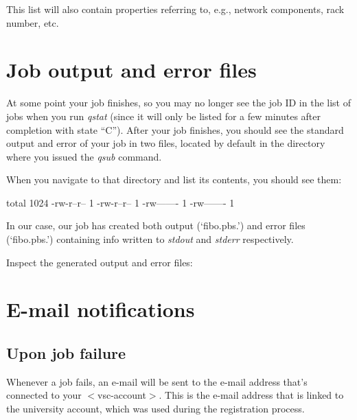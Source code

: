 This list will also contain properties referring to, e.g., network components,
rack number, etc.

\section{Job output and error files}

At some point your job finishes, so you may no longer see the job ID in the
list of jobs when you run \emph{qstat} (since it will only be listed for a few
minutes after completion with state ``C''). After your job finishes, you should
see the standard output and error of your job in two files, located by default
in the directory where you issued the \emph{qsub} command.


When you navigate to that directory and list its contents, you should see them:

\begin{prompt}
total 1024
-rw-r--r-- 1 %
-rw-r--r-- 1 %
-rw------- 1 %
-rw------- 1 %
\end{prompt}

In our case, our job has created both output (`fibo.pbs.\jobnumber') and
error files (`fibo.pbs.\jobnumber') containing info written to
\emph{stdout} and \emph{stderr} respectively.

Inspect the generated output and error files:

\begin{prompt}
\end{prompt}

\section{E-mail notifications}

\ifgent
\else
  \subsection{Upon job failure}
  
  Whenever a job fails, an e-mail will be sent to the e-mail address that's
  connected to your $<$vsc-account$>$. This is the e-mail address that is linked
  to the university account, which was used during the registration process.
  
